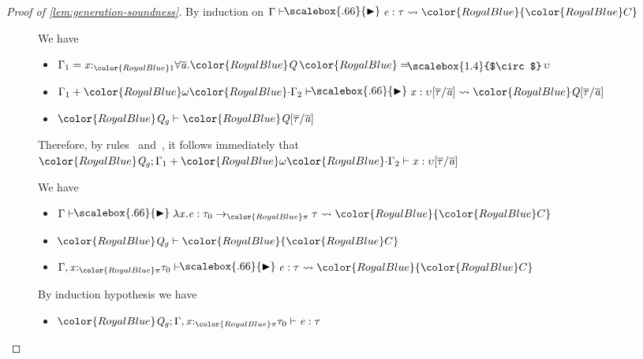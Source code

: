 \documentclass[acmsmall,usenames,dvipsnames,natbib=false,acmthm=false,screen]{acmart}
\newcommand{\constraintcolour}{\color{RoyalBlue}}
\newcommand{\constraintfont}[1]{{\constraintcolour#1}}
\newcommand{\multiplicitycolour}{\color{RoyalBlue}}
\newcommand{\multiplicityfont}[1]{{\multiplicitycolour#1}}
\newcommand{\vdashi}{%
      \mathrel{%
          \vdash\hspace*{-4pt}%
          \raisebox{0.9pt}{\scalebox{.66}{\(\blacktriangleright\)}}%
      }%
  }
\newcommand{\scale}{\constraintfont{\cdot}}
\newcommand{\constraintop}[1]{\mathop{\constraintfont{#1}}}
\newcommand{\lollycirc}{\raisebox{-0.255ex}{\scalebox{1.4}{$\circ$}}}
\newcommand{\Lolly}{\constraintop{=\kern-1.1ex \lollycirc}}
\theoremstyle{acmplain}
\theoremstyle{acmdefinition}
\begin{document}
\begin{proof}[Proof of \cref{lem:generation-soundness}]
  By induction on $\Gamma  \vdashi  \ottnt{e}  \ottsym{:}  \tau  \leadsto   \constraintfont{ \constraintfont{C} } $
  \begin{description}
  \item[] We have
    \begin{itemize}
    \item $\Gamma_{{\mathrm{1}}}  \ottsym{=}   \ottmv{x} {:}_{  \multiplicityfont{ \ottsym{1} }  }  \forall   \overline{\ottmv{a} } .   \constraintfont{ \ottnt{Q} }   \Lolly  \upsilon  $
    \item $\Gamma_{{\mathrm{1}}}  \ottsym{+}    \multiplicityfont{ \omega }  \scale \Gamma_{{\mathrm{2}}}   \vdashi  \ottmv{x}  \ottsym{:}  \upsilon  \ottsym{[}  \overline{\tau}  \ottsym{/}  \overline{\ottmv{a} }  \ottsym{]}  \leadsto   \constraintfont{ \ottnt{Q}  \ottsym{[}  \overline{\tau}  \ottsym{/}  \overline{\ottmv{a} }  \ottsym{]} } $
    \item $ \constraintfont{ \ottnt{Q_{\ottmv{g}}} }   \vdash   \constraintfont{ \ottnt{Q}  \ottsym{[}  \overline{\tau}  \ottsym{/}  \overline{\ottmv{a} }  \ottsym{]} } $
    \end{itemize}
    Therefore, by rules~ and~, it follows
    immediately that $ \constraintfont{ \ottnt{Q_{\ottmv{g}}} }   \ottsym{;}  \Gamma_{{\mathrm{1}}}  \ottsym{+}    \multiplicityfont{ \omega }  \scale \Gamma_{{\mathrm{2}}}   \vdash  \ottmv{x}  \ottsym{:}  \upsilon  \ottsym{[}  \overline{\tau}  \ottsym{/}  \overline{\ottmv{a} }  \ottsym{]}$
  \item[] We have
    \begin{itemize}
    \item $\Gamma  \vdashi  \lambda  \ottmv{x}  \ottsym{.}  \ottnt{e}  \ottsym{:}   \tau_{{\mathrm{0}}}  \to_{  \multiplicityfont{ \pi }  }  \tau   \leadsto   \constraintfont{ \constraintfont{C} } $
    \item $ \constraintfont{ \ottnt{Q_{\ottmv{g}}} }   \vdash   \constraintfont{ \constraintfont{C} } $
    \item $\Gamma  \ottsym{,}   \ottmv{x} {:}_{  \multiplicityfont{ \pi }  } \tau_{{\mathrm{0}}}   \vdashi  \ottnt{e}  \ottsym{:}  \tau  \leadsto   \constraintfont{ \constraintfont{C} } $
    \end{itemize}
    By induction hypothesis we have
    \begin{itemize}
    \item $ \constraintfont{ \ottnt{Q_{\ottmv{g}}} }   \ottsym{;}  \Gamma  \ottsym{,}   \ottmv{x} {:}_{  \multiplicityfont{ \pi }  } \tau_{{\mathrm{0}}}   \vdash  \ottnt{e}  \ottsym{:}  \tau$

\end{itemize}
\end{description}
\end{proof}
\end{document}

